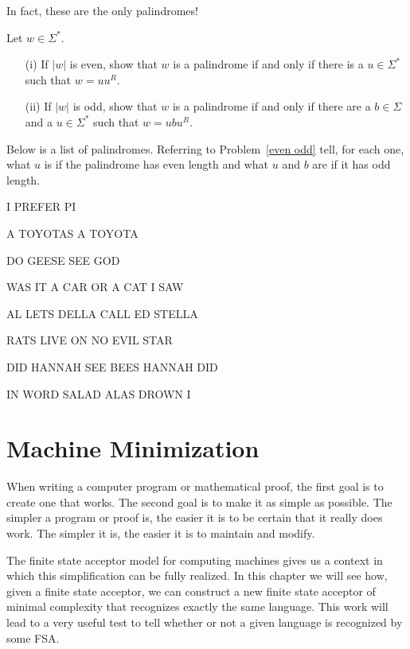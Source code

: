 \noindent In fact, these are the only palindromes!

\begin{prb} \label{even odd}
Let $w\in \Sigma^*$.
\begin{enumerate}
   \item[\rm{(i)}]  If $|w|$ is even, show that $w$ is a palindrome if and only if there is a $u\in \Sigma^*$ such that $w = uu^R$.
    \item[\rm{(ii)}]  If $|w|$ is odd, show that $w$ is a palindrome if and only if there are a $b\in \Sigma$ and a $u\in \Sigma^*$ such that $w = ubu^R$.
\end{enumerate}
\end{prb}

\begin{prb}
Below is a list of palindromes.  Referring to Problem~\ref{even odd} tell, for each one, what $u$ is if the palindrome has even length and what $u$ and $b$ are if it has odd length.

I PREFER PI

A TOYOTAS A TOYOTA

DO GEESE SEE GOD

WAS IT A CAR OR A CAT I SAW

AL LETS DELLA CALL ED STELLA

RATS LIVE ON NO EVIL STAR

DID HANNAH SEE BEES HANNAH DID

IN WORD SALAD ALAS DROWN I

\end{prb}



\chapter{Machine Minimization}

When writing a computer program or mathematical proof, the first goal is to create one that works.   The second goal is to make it as simple as possible. The simpler a program or proof is, the easier it is to be certain that it really does work.  The simpler it is, the easier it is to maintain and modify.

The finite state acceptor model for computing machines gives us a context in which this simplification can be fully realized.  In this chapter we will see how, given a finite state acceptor, we can construct a new finite state acceptor of minimal complexity that recognizes exactly the same language.  This work will lead to a very useful test to tell whether or not a given language is recognized by some FSA.

